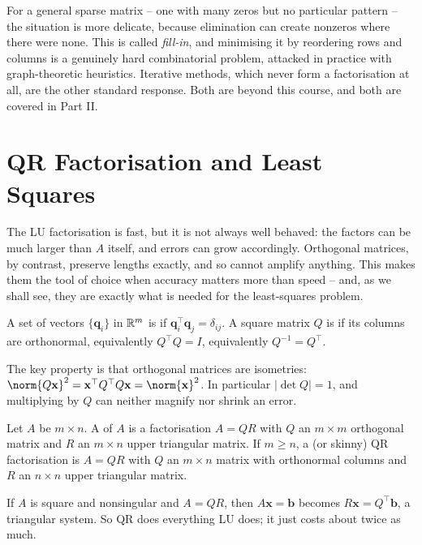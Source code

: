 \documentclass[a4paper]{scrartcl}
\providecommand{\abs}[1]{\left\lvert#1\right\rvert}
\renewcommand{\abs}[1]{\left\lvert#1\right\rvert}
\begin{document}
\begin{remark}
  For a general sparse matrix -- one with many zeros but no particular pattern -- the situation is more delicate, because elimination can create nonzeros where there were none. This is called \emph{fill-in}, and minimising it by reordering rows and columns is a genuinely hard combinatorial problem, attacked in practice with graph-theoretic heuristics. Iterative methods, which never form a factorisation at all, are the other standard response. Both are beyond this course, and both are covered in Part II.
\end{remark}


\section{QR Factorisation and Least Squares}\label{sec:qr}

The LU factorisation is fast, but it is not always well behaved: the factors can be much larger than $A$ itself, and errors can grow accordingly. Orthogonal matrices, by contrast, preserve lengths exactly, and so cannot amplify anything. This makes them the tool of choice when accuracy matters more than speed -- and, as we shall see, they are exactly what is needed for the least-squares problem.

\begin{definition}
  A set of vectors $\{\mathbf{q}_i\}$ in $\mathbb{R}^m$ is  if $\mathbf{q}_i^\top\mathbf{q}_j = \delta_{ij}$. A square matrix $Q$ is  if its columns are orthonormal, equivalently $Q^\top Q = I$, equivalently $Q^{-1} = Q^\top$.
\end{definition}

The key property is that orthogonal matrices are isometries: $\norm{Q\mathbf{x}}^2 = \mathbf{x}^\top Q^\top Q\mathbf{x} = \norm{\mathbf{x}}^2$. In particular $\abs{\det Q} = 1$, and multiplying by $Q$ can neither magnify nor shrink an error.

\begin{definition}[QR Factorisation]
  Let $A$ be $m\times n$. A  of $A$ is a factorisation $A = QR$ with $Q$ an $m\times m$ orthogonal matrix and $R$ an $m\times n$ upper triangular matrix. If $m \geq n$, a  (or skinny) QR factorisation is $A = QR$ with $Q$ an $m\times n$ matrix with orthonormal columns and $R$ an $n\times n$ upper triangular matrix.
\end{definition}

If $A$ is square and nonsingular and $A = QR$, then $A\mathbf{x} = \mathbf{b}$ becomes $R\mathbf{x} = Q^\top\mathbf{b}$, a triangular system. So QR does everything LU does; it just costs about twice as much.
\end{document}
